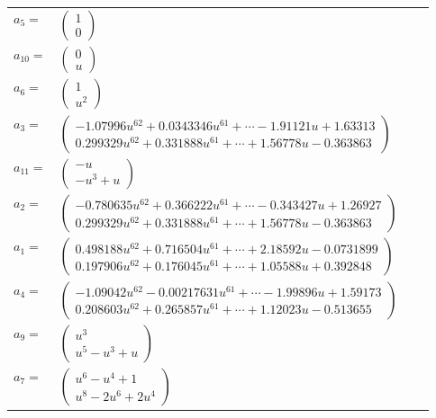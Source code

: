\documentclass[1p]{elsarticle_modified}
\theoremstyle{definition}
\begin{document}
\begin{tabular}{m{7pt} m{180pt} m{7pt} m{180pt} }
\flushright $a_{5}=$&$\begin{pmatrix}1\\0\end{pmatrix}$ \\
\flushright $a_{10}=$&$\begin{pmatrix}0\\u\end{pmatrix}$ \\
\flushright $a_{6}=$&$\begin{pmatrix}1\\u^2\end{pmatrix}$ \\
\flushright $a_{3}=$&$\begin{pmatrix}-1.07996 u^{62}+0.0343346 u^{61}+\cdots-1.91121 u+1.63313\\0.299329 u^{62}+0.331888 u^{61}+\cdots+1.56778 u-0.363863\end{pmatrix}$ \\
\flushright $a_{11}=$&$\begin{pmatrix}- u\\- u^3+u\end{pmatrix}$ \\
\flushright $a_{2}=$&$\begin{pmatrix}-0.780635 u^{62}+0.366222 u^{61}+\cdots-0.343427 u+1.26927\\0.299329 u^{62}+0.331888 u^{61}+\cdots+1.56778 u-0.363863\end{pmatrix}$ \\
\flushright $a_{1}=$&$\begin{pmatrix}0.498188 u^{62}+0.716504 u^{61}+\cdots+2.18592 u-0.0731899\\0.197906 u^{62}+0.176045 u^{61}+\cdots+1.05588 u+0.392848\end{pmatrix}$ \\
\flushright $a_{4}=$&$\begin{pmatrix}-1.09042 u^{62}-0.00217631 u^{61}+\cdots-1.99896 u+1.59173\\0.208603 u^{62}+0.265857 u^{61}+\cdots+1.12023 u-0.513655\end{pmatrix}$ \\
\flushright $a_{9}=$&$\begin{pmatrix}u^3\\u^5- u^3+u\end{pmatrix}$ \\
\flushright $a_{7}=$&$\begin{pmatrix}u^6- u^4+1\\u^8-2 u^6+2 u^4\end{pmatrix}$ \\

\end{tabular}
\end{document}
